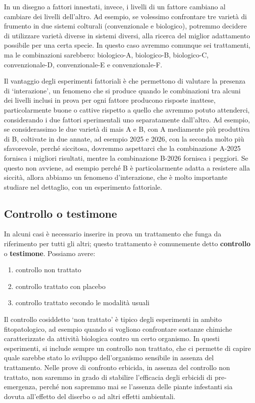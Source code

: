 \documentclass[a4paper,12pt,oneside]{book}
\providecommand{\tightlist}{%
  \setlength{\itemsep}{0pt}\setlength{\parskip}{0pt}}
\begin{document}
In un disegno a fattori innestati, invece, i livelli di un fattore cambiano al cambiare dei livelli dell'altro. Ad esempio, se volessimo confrontare tre varietà di frumento in due sistemi colturali (convenzionale e biologico), potremmo decidere di utilizzare varietà diverse in sistemi diversi, alla ricerca del miglior adattamento possibile per una certa specie. In questo caso avremmo comunque sei trattamenti, ma le combinazioni sarebbero: biologico-A, biologico-B, biologico-C, convenzionale-D, convenzionale-E e convenzionale-F.

Il vantaggio degli esperimenti fattoriali è che permettono di valutare la presenza di `interazione', un fenomeno che si produce quando le combinazioni tra alcuni dei livelli inclusi in prova per ogni fattore producono risposte inattese, particolarmente buone o cattive rispetto a quello che avremmo potuto attenderci, considerando i due fattori sperimentali uno separatamente dall'altro. Ad esempio, se considerassimo le due varietà di mais A e B, con A mediamente più produttiva di B, coltivate in due annate, ad esempio 2025 e 2026, con la seconda molto più sfavorevole, perché siccitosa, dovremmo aspettarci che la combinazione A-2025 fornisca i migliori risultati, mentre la combinazione B-2026 fornisca i peggiori. Se questo non avviene, ad esempio perché B è particolarmente adatta a resistere alla siccità, allora abbiamo un fenomeno d'interazione, che è molto importante studiare nel dettaglio, con un esperimento fattoriale.

\hypertarget{controllo-o-testimone}{%
\subsection{Controllo o testimone}\label{controllo-o-testimone}}

In alcuni casi è necessario inserire in prova un trattamento che funga da riferimento per tutti gli altri; questo trattamento è comunemente detto \textbf{controllo} o \textbf{testimone}. Possiamo avere:

\begin{enumerate}
\def\labelenumi{\arabic{enumi}.}
\tightlist
\item
  controllo non trattato
\item
  controllo trattato con placebo
\item
  controllo trattato secondo le modalità usuali
\end{enumerate}

Il controllo cosiddetto `non trattato' è tipico degli esperimenti in ambito fitopatologico, ad esempio quando si vogliono confrontare sostanze chimiche caratterizzate da attività biologica contro un certo organismo. In questi esperimenti, si include sempre un controllo non trattato, che ci permette di capire quale sarebbe stato lo sviluppo dell'organismo sensibile in assenza del trattamento. Nelle prove di confronto erbicida, in assenza del controllo non trattato, non saremmo in grado di stabilire l'efficacia degli erbicidi di pre-emergenza, perché non sapremmo mai se l'assenza delle piante infestanti sia dovuta all'effetto del diserbo o ad altri effetti ambientali.
\end{document}
